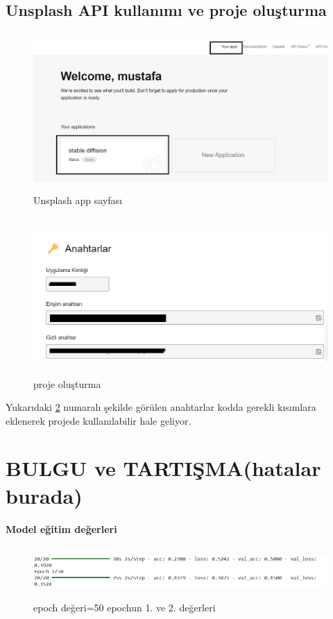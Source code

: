 \documentclass[12pt, a4paper]{article}
\begin{document}
	\subsection{Unsplash API kullanımı ve proje oluşturma}
	\begin{figure}[h]
		\centering
		\includegraphics[width=12cm,height=6cm]{app.png}
		\caption{Unsplash app sayfası}
		\label{görsel1}
	\end{figure}
	\begin{figure}[h]
		\centering
		\includegraphics[width=12cm,height=6cm]{unsplashKey.png}
		\caption{proje oluşturma}
		\label{proje}
	\end{figure}
	
	Yukarıdaki \ref{proje} numaralı şekilde görülen anahtarlar kodda gerekli kısımlara eklenerek projede kullanılabilir hale geliyor.
	\newpage
	
	\section{BULGU ve TARTIŞMA(hatalar burada)}
	\textbf{Model eğitim değerleri}
	\begin{figure}[h]
		\centering
		\includegraphics[width=12cm,height=2cm]{epoch1.png}
		\caption{epoch değeri=50 epochun 1. ve 2. değerleri}
		\label{epoch1}
	\end{figure}
	
\end{document}
